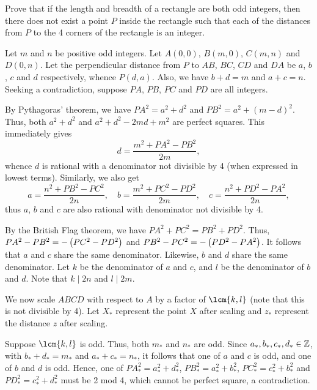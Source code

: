 \begin{question}\label{A::2022-O-2-2}
    Prove that if the length and breadth of a rectangle are both odd integers, then there does not exist a point $P$ inside the rectangle such that each of the distances from $P$ to the 4 corners of the rectangle is an integer.
\end{question}


 Let $m$ and $n$ be positive odd integers. Let $A(0, 0)$, $B(m, 0)$, $C(m, n)$ and $D(0, n)$. Let the perpendicular distance from $P$ to $AB$, $BC$, $CD$ and $DA$ be $a$, $b$, $c$ and $d$ respectively, whence $P(d, a)$. Also, we have $b + d = m$ and $a + c = n$. Seeking a contradiction, suppose $PA$, $PB$, $PC$ and $PD$ are all integers.

By Pythagoras' theorem, we have $PA^2 = a^2 + d^2$ and $PB^2 = a^2 + (m-d)^2$. Thus, both $a^2 + d^2$ and $a^2 + d^2 - 2md + m^2$ are perfect squares. This immediately gives \[d = \frac{m^2 + PA^2 - PB^2}{2m},\] whence $d$ is rational with a denominator not divisible by 4 (when expressed in lowest terms). Similarly, we also get \[a = \frac{n^2 + PB^2 - PC^2}{2n}, \quad b = \frac{m^2 + PC^2 - PD^2}{2m}, \quad c = \frac{n^2 + PD^2 - PA^2}{2n},\] thus $a$, $b$ and $c$ are also rational with denominator not divisible by 4.

By the British Flag theorem, we have $PA^2 + PC^2 = PB^2 + PD^2$. Thus, $PA^2 - PB^2 = -\left( PC^2 - PD^2 \right)$ and $PB^2 - PC^2 = -\left( PD^2 - PA^2 \right)$. It follows that $a$ and $c$ share the same denominator. Likewise, $b$ and $d$ share the same denominator. Let $k$ be the denominator of $a$ and $c$, and $l$ be the denominator of $b$ and $d$. Note that $k \mid 2n$ and $l \mid 2m$.

We now scale $ABCD$ with respect to $A$ by a factor of $\lcm{k, l}$ (note that this is not divisible by 4). Let $X_\ast$ represent the point $X$ after scaling and $z_\ast$ represent the distance $z$ after scaling.

 Suppose $\lcm{k, l}$ is odd. Thus, both $m_\ast$ and $n_\ast$ are odd. Since $a_\ast, b_\ast, c_\ast, d_\ast \in \mathbb{Z}$, with $b_\ast + d_\ast = m_\ast$ and $a_\ast + c_\ast = n_\ast$, it follows that one of $a$ and $c$ is odd, and one of $b$ and $d$ is odd. Hence, one of $PA_\ast^2 = a_\ast^2 + d_\ast^2$, $PB_\ast^2 = a_\ast^2 + b_\ast^2$, $PC_\ast^2 = c_\ast^2 + b_\ast^2$ and $PD_\ast^2 = c_\ast^2 + d_\ast^2$ must be 2 mod 4, which cannot be perfect square, a contradiction.

